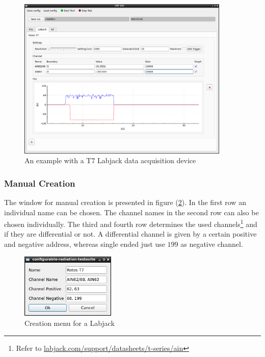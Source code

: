\documentclass[10pt,a4paper]{article}
\begin{document}
	\begin{figure}[H]
	\centering
	\includegraphics[width=0.9\textwidth]{./3_LBJ_example.png}
	\caption{An example with a T7 Labjack data acquisition device}
	\label{f:lbj_example}
	\end{figure}
	
	\subsubsection{Manual Creation}	
	
	The window for manual creation is presented in figure (\ref{f:lbj_menu}). In the first row an individual name can be chosen. The channel names in the second row can also be chosen individually. The third and fourth row determines the used channels\footnote{Refer to \url{labjack.com/support/datasheets/t-series/ain}} and if they are differential or not. A differential channel is given by a certain positive and negative address, whereas single ended just use $199$ as negative channel.
	
	
	\begin{figure}[H]
	\centering
	\includegraphics[width=0.4\textwidth]{./3_LBJ_menu.png}
	\caption{Creation menu for a Labjack}
	\label{f:lbj_menu}
	\end{figure}
	
\end{document}
